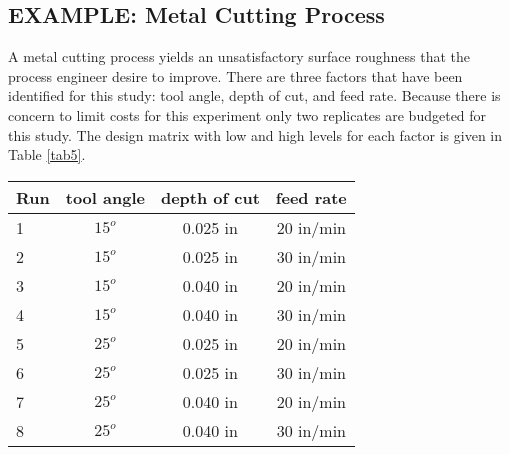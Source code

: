 \subsection{EXAMPLE: Metal Cutting Process}
A metal cutting process yields an unsatisfactory surface roughness that the process engineer desire to improve.  There are three factors that have been identified for this study: tool angle, depth of cut, and feed rate. Because there is concern to limit costs for this experiment only two replicates are budgeted for this study.  The design matrix with low and high levels for each factor is given in Table \ref{tab5}.

\begin{sidewaystable}\caption{Metal Cutting Experiment Design}\label{tab5}
\begin{center}
\begin{tabular}{|l|c|c|c|}
\hline Run & \textbf{tool angle} & \textbf{depth of cut} & \textbf{feed rate}\\ 
\hline 1 & $15^{o}$ & 0.025 in & 20 in/min \\ 
\hline 2 & $15^{o}$ & 0.025 in & 30 in/min \\ 
\hline 3 & $15^{o}$ & 0.040 in & 20 in/min \\ 
\hline 4 & $15^{o}$ & 0.040 in & 30 in/min \\
\hline 5 & $25^{o}$ & 0.025 in & 20 in/min \\
\hline 6 & $25^{o}$ & 0.025 in & 30 in/min \\
\hline 7 & $25^{o}$ & 0.040 in & 20 in/min \\
\hline 8 & $25^{o}$ & 0.040 in & 30 in/min \\ 
\hline 
\end{tabular} 
\end{center}
\end{sidewaystable}

